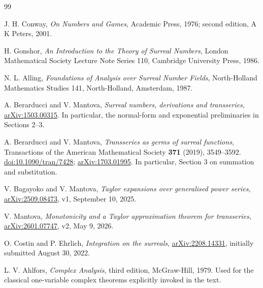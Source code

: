 \documentclass[11pt,a4paper]{article}
\numberwithin{equation}{section}
\theoremstyle{definition}
\theoremstyle{remark}
\newcommand{\arxiv}[1]{\href{https://arxiv.org/abs/#1}{arXiv:#1}}
\begin{document}
\begin{thebibliography}{99}
\raggedright
{}
J. H. Conway, \emph{On Numbers and Games}, Academic Press, 1976; second edition, A K Peters, 2001.

H. Gonshor, \emph{An Introduction to the Theory of Surreal Numbers}, London Mathematical Society Lecture Note Series 110, Cambridge University Press, 1986.

N. L. Alling, \emph{Foundations of Analysis over Surreal Number Fields}, North-Holland Mathematics Studies 141, North-Holland, Amsterdam, 1987.

A. Berarducci and V. Mantova, \emph{Surreal numbers, derivations and transseries}, \arxiv{1503.00315}. In particular, the normal-form and exponential preliminaries in Sections 2--3.

A. Berarducci and V. Mantova, \emph{Transseries as germs of surreal functions}, Transactions of the American Mathematical Society \textbf{371} (2019), 3549--3592. \href{https://doi.org/10.1090/tran/7428}{doi:10.1090/tran/7428}; \arxiv{1703.01995}. In particular, Section 3 on summation and substitution.

V. Bagayoko and V. Mantova, \emph{Taylor expansions over generalised power series}, \arxiv{2509.08473}, v1, September 10, 2025.

V. Mantova, \emph{Monotonicity and a Taylor approximation theorem for transseries}, \arxiv{2601.07747}, v2, May 9, 2026.

O. Costin and P. Ehrlich, \emph{Integration on the surreals}, \arxiv{2208.14331}, initially submitted August 30, 2022.

L. V. Ahlfors, \emph{Complex Analysis}, third edition, McGraw-Hill, 1979. Used for the classical one-variable complex theorems explicitly invoked in the text.
\end{thebibliography}
\end{document}

